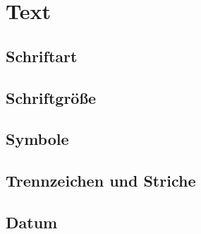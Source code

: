 \section{Text}

\subsection{Schriftart}

\subsection{Schriftgröße}

\subsection{Symbole}

\subsection{Trennzeichen und Striche}

\subsection{Datum}

\newpage